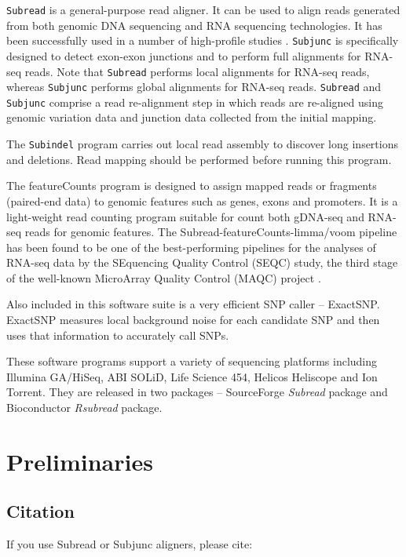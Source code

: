 \documentclass[12pt]{report}
\newcommand{\code}[1]{{\small\texttt{#1}}}
\newcommand{\Subread}{\textsf{Subread}}
\newcommand{\Subjunc}{\textsf{Subjunc}}
\newcommand{\ExactSNP}{\textsf{ExactSNP}}
\newcommand{\featureCounts}{\textsf{featureCounts}}
\begin{document}
\code{Subread} is a general-purpose read aligner.
It can be used to align reads generated from both genomic DNA sequencing and RNA sequencing technologies.
It has been successfully used in a number of high-profile studies \cite{TangNC2013,ManNI2013,SpangenbergSCR2013,tang,ezh2}.
\code{Subjunc} is specifically designed to detect exon-exon junctions and to perform full alignments for RNA-seq reads.
Note that \code{Subread} performs local alignments for RNA-seq reads, whereas \code{Subjunc} performs global alignments for RNA-seq reads.
\code{Subread} and \code{Subjunc} comprise a read re-alignment step in which reads are re-aligned using genomic variation data and junction data collected from the initial mapping.

The \code{Subindel} program carries out local read assembly to discover long insertions and deletions.
Read mapping should be performed before running this program.

The {\featureCounts} program is designed to assign mapped reads or fragments (paired-end data) to genomic features such as genes, exons and promoters.
It is a light-weight read counting program suitable for count both gDNA-seq and RNA-seq reads for genomic features\cite{fcounts}.
The \textsf{Subread-featureCounts-limma/voom} pipeline has been found to be one of the best-performing pipelines for the analyses of RNA-seq data by the SEquencing Quality Control (SEQC) study, the third stage of the well-known MicroArray Quality Control (MAQC) project \cite{seqc}.

Also included in this software suite is a very efficient SNP caller -- {\ExactSNP}.
{\ExactSNP} measures local background noise for each candidate SNP and then uses that information to accurately call SNPs.

These software programs support a variety of sequencing platforms including Illumina GA/HiSeq, ABI SOLiD, Life Science 454, Helicos Heliscope and Ion Torrent. They are released in two packages -- SourceForge \emph{Subread} package and Bioconductor \emph{Rsubread} package.

\chapter{Preliminaries}

\section{Citation}

If you use {\Subread} or {\Subjunc} aligners, please cite:\\
\end{document}
